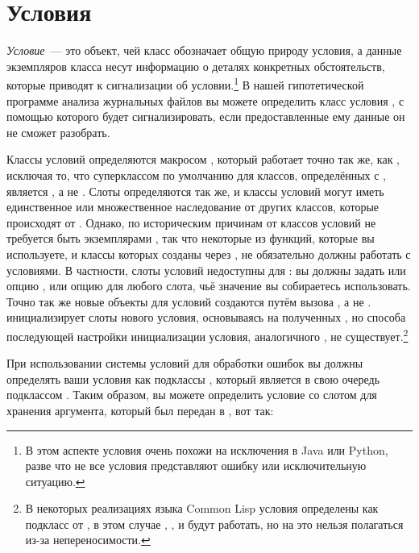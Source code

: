 \section{Условия}

\textit{Условие}~--- это объект, чей класс обозначает общую природу условия, а данные
экземпляров класса несут информацию о деталях конкретных обстоятельств, которые приводят к
сигнализации об условии.\footnote{В этом аспекте условия очень похожи на исключения в Java
  или Python, разве что не все условия представляют ошибку или исключительную ситуацию.} В
нашей гипотетической программе анализа журнальных файлов вы можете определить класс
условия , с помощью которого  будет
сигнализировать, если предоставленные ему данные он не сможет разобрать.

Классы условий определяются макросом , который работает точно так
же, как , исключая то, что суперклассом по умолчанию для классов,
определённых с , является , а не
. Слоты определяются так же, и классы условий могут иметь
единственное или множественное наследование от других классов, которые происходят от
. Однако, по историческим причинам от классов условий не требуется быть
экземплярами , так что некоторые из функций, которые вы используете,
и классы которых созданы через , не обязательно должны работать с
условиями. В частности, слоты условий недоступны для : вы должны задать
или опцию , или опцию  для любого слота, чьё значение вы
собираетесь использовать. Точно так же новые объекты для условий создаются путём вызова
, а не .  инициализирует
слоты нового условия, основываясь на полученных , но способа последующей
настройки инициализации условия, аналогичного , не
существует.\footnote{В некоторых реализациях языка Common Lisp условия определены как
  подкласс от , в этом случае ,
  , и  будут работать, но на это нельзя
  полагаться из-за непереносимости.}

При использовании системы условий для обработки ошибок вы должны определять ваши условия
как подклассы , который является в свою очередь подклассом
. Таким образом, вы можете определить условие
 со слотом для хранения аргумента, который был передан в
, вот так:

